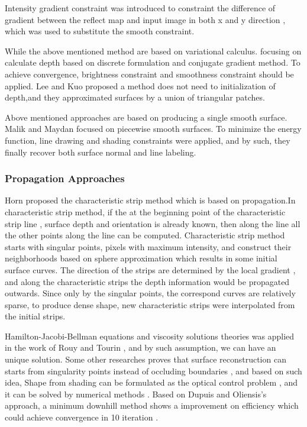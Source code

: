 Intensity gradient constraint\cite{zheng1991estimation} was introduced to constraint the difference of gradient between the reflect map and input image in both x and y direction , which was used to substitute the smooth constraint. 

While the above mentioned method are based on variational calculus.
\cite{lee1993shape} focusing on calculate depth based on  discrete formulation and conjugate gradient method. To achieve convergence, brightness constraint and smoothness constraint should be applied.  Lee and Kuo \cite{lee1993shape} proposed a method  does not need to initialization of depth,and they approximated surfaces by a union of triangular patches. 

Above mentioned approaches are based on producing a single smooth surface. Malik and Maydan \cite{malik1989recovering} focused on piecewise smooth surfaces. To minimize the energy function, line drawing and shading constraints were applied, and by such, they finally recover both surface normal and line labeling.

\subsubsection{Propagation Approaches}

Horn proposed the characteristic strip method \cite{horn1990height} which is based on propagation.In  characteristic strip method, if the at the beginning point of the characteristic strip  line , surface depth and orientation is already known, then along the line all the other points along the line can be computed. Characteristic strip method starts with singular points, pixels with maximum intensity, and construct their neighborhoods based on sphere approximation which results in some initial surface curves. The direction of the strips are determined by the local gradient , and along the characteristic strips the depth information would be propagated outwards. Since only by the singular points, the correspond curves are relatively sparse, to produce dense shape, new characteristic strips were interpolated from the initial strips. 

Hamilton-Jacobi-Bellman equations and viscosity solutions theories was applied in the work of Rouy and Tourin \cite{rouy1992viscosity} , and by such assumption, we can have an unique solution.
Some other researches proves that surface reconstruction can starts from singularity points instead of occluding boundaries \cite{oliensis1991shape},  and based on such idea, Shape from shading can be formulated as the optical control problem , and it can be solved by numerical methods \cite{oliensis1993global}. Based on  Dupuis and Oliensis's approach, a minimum downhill method shows a improvement on efficiency which could achieve convergence in 10 iteration \cite{dupuis1992direct} .  

